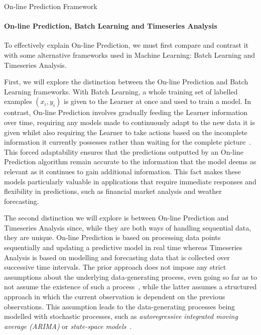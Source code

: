 \begin{protocol}[H]
    \caption{On-line Prediction Framework}\label{on-line_prediction_framework}
    \begin{algorithmic}[1]
    \end{algorithmic}
\end{protocol}

\paragraph{On-line Prediction, Batch Learning and Timeseries Analysis}\label{paragraph:on-line_prediction_batch_learning_and_timeseries_analysis}
To effectively explain On-line Prediction, we must first compare and contrast it with some alternative frameworks used in Machine Learning: Batch Learning and Timeseries Analysis.

First, we will explore the distinction between the On-line Prediction and Batch Learning frameworks. With Batch Learning, a whole training set of labelled examples $(x_i, y_i)$ is given to the Learner at once and used to train a model. In contrast, On-line Prediction involves gradually feeding the Learner information over time, requiring any models made to continuously adapt to the new data it is given whilst also requiring the Learner to take actions based on the incomplete information it currently possesses rather than waiting for the complete picture~\cite{kalnishkan:2015}. This forced adaptability ensures that the predictions outputted by an On-line Prediction algorithm remain accurate to the information that the model deems as relevant as it continues to gain additional information. This fact makes these models particularly valuable in applications that require immediate responses and flexibility in predictions, such as financial market analysis and weather forecasting.

The second distinction we will explore is between On-line Prediction and Timeseries Analysis since, while they are both ways of handling sequential data, they are unique. On-line Prediction is based on processing data points sequentially and updating a predictive model in real time whereas Timeseries Analysis is based on modelling and forecasting data that is collected over successive time intervals. The prior approach does not impose any strict assumptions about the underlying data-generating process, even going so far as to not assume the existence of such a process~\cite{vovk:2001}, while the latter assumes a structured approach in which the current observation is dependent on the previous observations. This assumption leads to the data-generating processes being modelled with stochastic processes, such as \textit{autoregressive integrated moving average (ARIMA)} or \textit{state-space models}~\cite{box:2015}.


